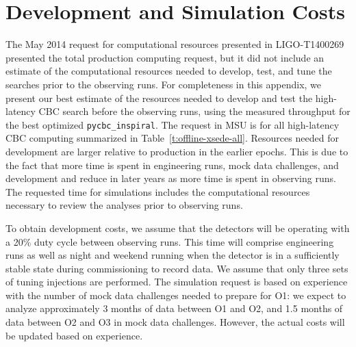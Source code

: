 \section{Development and Simulation Costs}
\vspace*{-5pt}

The May 2014 request for computational resources presented in LIGO-T1400269
presented the total production computing request, but it did not include an
estimate of the computational resources needed to develop, test, and tune the
searches prior to the observing runs. For completeness in this appendix, we
present our best estimate of the resources needed to develop and test the
high-latency CBC search before the observing runs, using the measured
throughput for the best optimized \texttt{pycbc\_inspiral}. The request in MSU
is for all high-latency CBC computing summarized in
Table~\ref{t:offline-xsede-all}. Resources needed for development are larger
relative to production in the earlier epochs. This is due to the fact that
more time is spent in engineering runs, mock data challenges, and development
and reduce in later years as more time is spent in observing runs. The
requested time for simulations includes the computational resources necessary
to review the analyses prior to observing runs. 

To obtain development costs, we assume that the detectors will be operating
with a 20\% duty cycle between observing runs. This time will comprise
engineering runs as well as night and weekend running when the detector is in
a sufficiently stable state during commissioning to record data. We assume
that only three sets of tuning injections are performed. The simulation
request is based on experience with the number of mock data challenges needed
to prepare for O1: we expect to analyze approximately 3 months of data between
O1 and O2, and 1.5 months of data between O2 and O3 in mock data challenges.
However, the actual costs will be updated based on experience.

